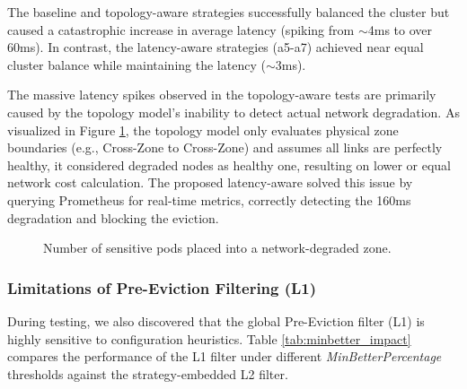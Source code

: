 The baseline and topology-aware strategies successfully balanced the cluster but caused a catastrophic increase in average latency (spiking from $\sim$4ms to over 60ms). In contrast, the latency-aware strategies (a5-a7) achieved near equal cluster balance while maintaining the latency ($\sim$3ms).

The massive latency spikes observed in the topology-aware tests are primarily caused by the topology model's inability to detect actual network degradation. As visualized in Figure \ref{fig:topology_flaw}, the topology model only evaluates physical zone boundaries (e.g., Cross-Zone to Cross-Zone) and assumes all links are perfectly healthy, it considered degraded nodes as healthy one, resulting on lower or equal network cost calculation. The proposed latency-aware solved this issue by querying Prometheus for real-time metrics, correctly detecting the 160ms degradation and blocking the eviction.

\begin{figure}[H]
    \centering
    \caption{Number of sensitive pods placed into a network-degraded zone.}
    \label{fig:topology_flaw}
\end{figure}

\subsubsection{Limitations of Pre-Eviction Filtering (L1)}
\label{subsubsec:netaware4_resultanalysis1_limitation}

During testing, we also discovered that the global Pre-Eviction filter (L1) is highly sensitive to configuration heuristics. Table \ref{tab:minbetter_impact} compares the performance of the L1 filter under different \textit{MinBetterPercentage} thresholds against the strategy-embedded L2 filter.

